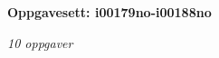 \centerline{\bf Oppgavesett: i00179no-i00188no}
\vskip 10pt
\centerline{\it 10 oppgaver}\vskip 10pt
\vskip 10pt
